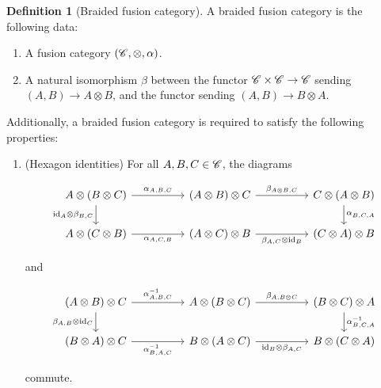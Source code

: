 \documentclass{article}
\theoremstyle{definition}
\newtheorem*{definition}{Definition}
\numberwithin{figure}{section}
\begin{document}
\begin{definition}[Braided fusion category] A braided fusion category is the following data:

\begin{enumerate}
\item A fusion category $(\mathscr{C},\otimes,\alpha)$.
\item A natural isomorphism $\beta$ between the functor $\mathscr{C}\times \mathscr{C}\to \mathscr{C}$ sending $(A,B)\to A\otimes B$, and the functor sending $(A,B)\to B\otimes A$.
\end{enumerate}

Additionally, a braided fusion category is required to satisfy the following properties:

\begin{enumerate}
\item (Hexagon identities) For all $A,B,C\in \mathscr{C}$, the diagrams

\[\begin{tikzcd}
	{A\otimes (B\otimes C)} && {(A\otimes B)\otimes C} && {C\otimes (A\otimes B)} \\
	{A\otimes (C\otimes B)} && {(A\otimes C)\otimes B} && {(C\otimes A)\otimes B}
	\arrow["{\alpha_{A,B,C}}", from=1-1, to=1-3]
	\arrow["{\beta_{A\otimes B,C}}", from=1-3, to=1-5]
	\arrow["{\alpha^{}_{B,C,A}}", from=1-5, to=2-5]
	\arrow["{\id_A\otimes \beta_{B,C}}"', from=1-1, to=2-1]
	\arrow["{\alpha_{A,C,B}}"', from=2-1, to=2-3]
	\arrow["{\beta_{A,C}\otimes \id_B}"', from=2-3, to=2-5]
\end{tikzcd}\]

and

\[\begin{tikzcd}
	{(A\otimes B)\otimes C} && {A\otimes (B\otimes C)} && {(B\otimes C)\otimes A} \\
	{(B\otimes A)\otimes C} && {B\otimes (A\otimes C)} && {B\otimes (C\otimes A)}
	\arrow["{\alpha^{-1}_{A,B,C}}", from=1-1, to=1-3]
	\arrow["{\beta_{A,B\otimes C}}", from=1-3, to=1-5]
	\arrow["{\alpha^{-1}_{B,C,A}}", from=1-5, to=2-5]
	\arrow["{\beta_{A,B}\otimes \id_C}"', from=1-1, to=2-1]
	\arrow["{\alpha^{-1}_{B,A,C}}"', from=2-1, to=2-3]
	\arrow["{\id_B\otimes \beta_{A,C}}"', from=2-3, to=2-5]
\end{tikzcd}\]

commute.
\end{enumerate}

\raggedleft\qedsymbol{}
\end{definition}
\end{document}
